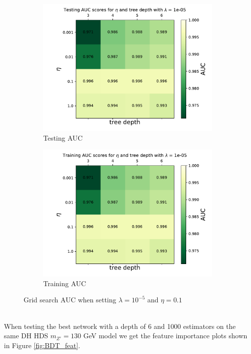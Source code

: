 \documentclass[14pt, a4paper]{book}
\begin{document}
\begin{figure}[!ht]
\centering
\begin{subfigure}[b]{0.49\textwidth}
      \centering
      \includegraphics[width=1\textwidth]{Testing_AUC.pdf}
      \caption{Testing AUC}
   \end{subfigure}
   \hfill
   \begin{subfigure}[b]{0.49\textwidth}
      \centering
      \includegraphics[width=1\textwidth]{Training_AUC.pdf}
      \caption{Training AUC}
   \end{subfigure}
   \caption{Grid search AUC when setting $\lambda=10^{-5}$ and $\eta=0.1$}\label{fig:BDT_GRID_AUC}
\end{figure}
\\When testing the best network with a depth of 6 and 1000 estimators on the same DH HDS $m_{Z'}=130$ GeV model we get the feature importance plots shown in Figure \ref{fig:BDT_feat}. 
\end{document}
